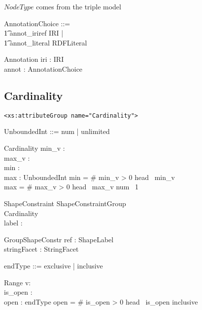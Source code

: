 \documentclass{article}
\begin{document}
$NodeType$ comes from the triple model

\begin{zed}
AnnotationChoice ::= \\
\t1 annot\_iriref \ldata IRI \rdata | \\
\t1 annot\_literal \ldata RDFLiteral \rdata
\end{zed}

\begin{schema}{Annotation}
	iri : IRI \\
	annot : AnnotationChoice
\end{schema}




\subsection{Cardinality}
\verb|<xs:attributeGroup name="Cardinality">|
\begin{zed}
UnboundedInt ::= num \ldata \nat \rdata | unlimited
\end{zed}
\begin{schema}{Cardinality}
   min\_v : \optional[\nat] \\
   max\_v : \optional[UnboundedInt] \\
   min : \nat \\
   max : UnboundedInt
\where
   min = \IF \# min\_v > 0 \THEN head~ min\_v  \\
   max = \IF \# max\_v > 0 \THEN head~ max\_v \ELSE num~ 1
\end{schema}
\begin{zed}
[ShapeConstraint']
\end{zed}


\begin{schema}{ShapeConstraint}
   ShapeConstraintGroup \\
   Cardinality \\
   label : \optional[ShapeLabel]
\end{schema}




\begin{schema}{GroupShapeConstr}
	ref : \power ShapeLabel \\
	stringFacet : \power StringFacet
\end{schema}

\begin{zed}
endType ::= exclusive | inclusive
\end{zed}

\begin{schema}{Range}
   v: \nat \\
   is\_open : \optional[endType] \\
   open : endType
\where
   open = \IF \# is\_open > 0 \THEN head~ is\_open \ELSE inclusive
\end{schema}
  
\end{document}
